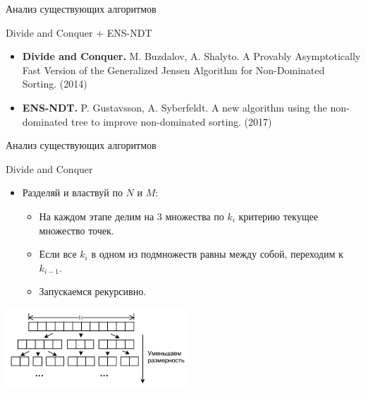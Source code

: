 \documentclass[table]{beamer}
\begin{document}
\begin{frame}{Анализ существующих алгоритмов}
\begin{block}{Divide and Conquer + ENS-NDT}
\begin{center}
\end{center}
\begin{itemize}
\item \textbf{Divide and Conquer.} M. Buzdalov, A. Shalyto. A Provably Asymptotically Fast Version of the Generalized Jensen Algorithm for Non-Dominated Sorting. (2014)
\item \textbf{ENS-NDT.} P. Gustavsson, A. Syberfeldt. A new algorithm using the non-dominated tree to improve non-dominated sorting. (2017)
\end{itemize}
\end{block}
\end{frame}

\begin{frame}{Анализ существующих алгоритмов}
\begin{block}{Divide and Conquer}
\begin{itemize}
\item Разделяй и властвуй по $N$ и $M$:
\begin{itemize}
\item На каждом этапе делим на 3 множества по $k_i$ критерию текущее множество точек.
\item Если все $k_i$ в одном из подмножеств равны между собой, переходим к $k_{i-1}$.
\item Запускаемся рекурсивно.
\end{itemize}
\end{itemize}
\begin{center}
\includegraphics*[height=3cm]{pic/fast_pic.png}
\end{center}
\end{block}
\end{frame}
\end{document}
